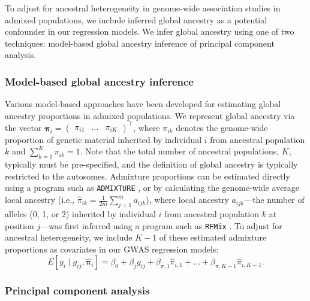 \documentclass[12pt]{article}
\newcommand{\edit}[1]{{\color{red}{#1}}}
\begin{document}
To adjust for ancestral heterogeneity in genome-wide association studies in admixed populations, we include inferred global ancestry as a potential confounder in our regression models. We infer global ancestry using one of two techniques: model-based global ancestry inference of principal component analysis.


\subsubsection{Model-based global ancestry inference}

Various model-based approaches have been developed for estimating global ancestry proportions in admixed populations.
We represent global ancestry via the vector $\boldsymbol{\pi}_i = \begin{pmatrix} \pi_{i1} & \dots & \pi_{iK} \end{pmatrix}^\top$, where $\pi_{ik}$ denotes the genome-wide proportion of genetic material inherited by individual $i$ from ancestral population $k$ and $\sum_{k=1}^K \pi_{ik} = 1$. 
Note that the total number of ancestral populations, $K$, typically must be pre-specified, and the definition of global ancestry is typically restricted to the autosomes.
Admixture proportions can be estimated directly using a program such as \texttt{ADMIXTURE} \citep{admixture}, or by calculating the genome-wide average local ancestry (i.e., $\hat\pi_{ik} = \frac{1}{2m} \sum_{j=1}^m a_{ijk}$), where local ancestry $a_{ijk}$---the number of alleles (0, 1, or 2) inherited by individual $i$ from ancestral population $k$ at position $j$---was first inferred using a program such as \texttt{RFMix} \citep{rfmix}.
To adjust for ancestral heterogeneity, we include $K-1$ of these estimated admixture proportions as covariates in our GWAS regression models: $$E[y_i \mid g_{ij}, \hat{\boldsymbol\pi}_i] = \beta_0 + \beta_j g_{ij} + \beta_{\pi, 1} \hat\pi_{i,1} + \dots + \beta_{\pi, K-1} \hat\pi_{i, K-1}.$$

\subsubsection{Principal component analysis}
\end{document}
